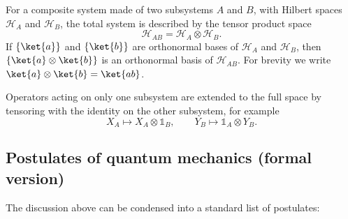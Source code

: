 For a composite system made of two subsystems $A$ and $B$, with Hilbert spaces $\mathcal{H}_A$ and $\mathcal{H}_B$, the total system is described by the tensor product space
\begin{equation}
	\mathcal{H}_{AB} = \mathcal{H}_A \otimes \mathcal{H}_B.
\end{equation}
If $\{\ket{a}\}$ and $\{\ket{b}\}$ are orthonormal bases of $\mathcal{H}_A$ and $\mathcal{H}_B$, then $\{\ket{a}\otimes\ket{b}\}$ is an orthonormal basis of $\mathcal{H}_{AB}$. 
For brevity we write $\ket{a}\otimes\ket{b} = \ket{ab}$.

Operators acting on only one subsystem are extended to the full space by tensoring with the identity on the other subsystem, for example
\begin{equation}
	X_A \mapsto X_A \otimes \mathbb{1}_B,
	\qquad
	Y_B \mapsto \mathbb{1}_A \otimes Y_B.
\end{equation}

\subsection{Postulates of quantum mechanics (formal version)}

The discussion above can be condensed into a standard list of postulates:

